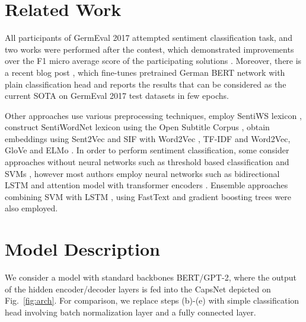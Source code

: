 \documentclass{article}
\begin{document}




\section{Related Work}
\label{sec:related}

All participants of GermEval 2017 attempted sentiment classification task, and two works were performed after the contest, which demonstrated improvements over the F1 micro average score of the participating solutions \cite{germevaltask2017, biesialska2020sentiment}. Moreover, there is a recent blog post \cite{kostic2020}, which fine-tunes pretrained German BERT network with plain classification head and reports the results that can be considered as the current SOTA on GermEval 2017 test datasets in few epochs. 

Other approaches use various preprocessing techniques, employ SentiWS lexicon \cite{schulz2017germeval, hovelmann2017fasttext, sidarenka2017potts}, construct SentiWordNet lexicon using the Open Subtitle Corpus \cite{naderalvojoud2017germeval}, obtain embeddings using Sent2Vec and SIF with Word2Vec \cite{lee2017ukp}, TF-IDF and Word2Vec\cite{ruppert2017lt}, GloVe \cite{mishra2017, biesialska2020sentiment} and ELMo \cite{biesialska2020sentiment}. In order to perform sentiment classification, some consider approaches without neural networks such as threshold based classification \cite{schulz2017germeval} and SVMs \cite{sidarenka2017potts}, however most authors employ neural networks such as bidirectional LSTM \cite{sidarenka2017potts, mishra2017, naderalvojoud2017germeval, lee2017ukp} and attention model with transformer encoders \cite{biesialska2020sentiment}. Ensemble approaches combining SVM with LSTM \cite{sidarenka2017potts}, using FastText  \cite{hovelmann2017fasttext} and gradient boosting trees \cite{hovelmann2017fasttext, sayyed2017idst} were also employed.

\section{Model Description}
We consider a model with standard backbones BERT/GPT-2, where the output of the hidden encoder/decoder layers is fed into the CapsNet depicted on Fig.~\ref{fig:arch}. For comparison, we replace steps (b)-(e) with simple classification head involving batch normalization layer and a fully connected layer. 
 
\end{document}
